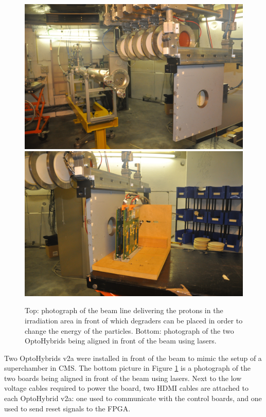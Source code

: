     \begin{figure}[p!]
      \centering
      \includegraphics[width=\textwidth]{img/II-5-irradiation/cyclotron.jpg} \\
      \vspace*{0.4cm}
      \includegraphics[width=\textwidth]{img/II-5-irradiation/boards.jpg}
      \caption{Top: photograph of the beam line delivering the protons in the irradiation area in front of which degraders can be placed in order to change the energy of the particles. Bottom: photograph of the two OptoHybrids being aligned in front of the beam using lasers.}
      \label{fig:II-5-cyclotron}
    \end{figure}

    Two OptoHybrids v2a were installed in front of the beam to mimic the setup of a superchamber in CMS. The bottom picture in Figure \ref{fig:II-5-cyclotron} is a photograph of the two boards being aligned in front of the beam using lasers. Next to the low voltage cables required to power the board, two HDMI cables are attached to each OptoHybrid v2a: one used to communicate with the control boards, and one used to send reset signals to the FPGA. \\

